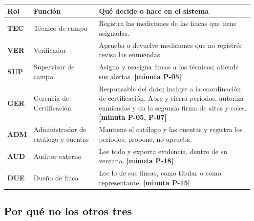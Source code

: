\documentclass[11pt,letterpaper]{article}
\newcommand{\cab}[1]{\textbf{\rmfamily #1}}
\newcommand{\resp}[1]{\textrm{\footnotesize\bfseries [minuta #1]}}
\newcommand{\rol}[1]{\textrm{\bfseries #1}}
\begin{document}
\begin{center}
\small
\renewcommand{\arraystretch}{1.2}
\begin{tabularx}{\textwidth}{@{}L{0.9cm} L{4.1cm} Y@{}}
\toprule
\cab{Rol} & \cab{Función} & \cab{Qué decide o hace en el sistema} \\
\midrule
\rol{TEC} & Técnico de campo & Registra las mediciones de las fincas que tiene asignadas. \\
\rol{VER} & Verificador & Aprueba o devuelve mediciones que no registró; revisa las enmiendas. \\
\rol{SUP} & Supervisor de campo & Asigna y reasigna fincas a los técnicos; atiende sus alertas. \resp{P-05} \\
\rol{GER} & Gerencia de Certificación & Responsable del dato; incluye a la coordinación de certificación. Abre y cierra períodos, autoriza enmiendas y da la segunda firma de altas y roles. \resp{P-05, P-07} \\
\rol{ADM} & Administrador de catálogo y cuentas & Mantiene el catálogo y las cuentas y registra los períodos; propone, no aprueba. \\
\rol{AUD} & Auditor externo & Lee todo y exporta evidencia, dentro de su ventana. \resp{P-18} \\
\rol{DUE} & Dueño de finca & Lee lo de sus fincas, como titular o como representante. \resp{P-15} \\
\bottomrule
\end{tabularx}
\end{center}

\subsection{Por qué no los otros tres}
\label{sec:descartes}
\end{document}
